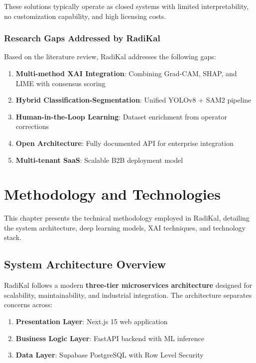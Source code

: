 \documentclass[12pt,a4paper]{report}
\begin{document}
These solutions typically operate as closed systems with limited interpretability, no customization capability, and high licensing costs.

\subsection{Research Gaps Addressed by RadiKal}

Based on the literature review, RadiKal addresses the following gaps:

\begin{enumerate}
    \item \textbf{Multi-method XAI Integration}: Combining Grad-CAM, SHAP, and LIME with consensus scoring
    \item \textbf{Hybrid Classification-Segmentation}: Unified YOLOv8 + SAM2 pipeline
    \item \textbf{Human-in-the-Loop Learning}: Dataset enrichment from operator corrections
    \item \textbf{Open Architecture}: Fully documented API for enterprise integration
    \item \textbf{Multi-tenant SaaS}: Scalable B2B deployment model
\end{enumerate}

\chapter{Methodology and Technologies}

This chapter presents the technical methodology employed in RadiKal, detailing the system architecture, deep learning models, XAI techniques, and technology stack.

\section{System Architecture Overview}

RadiKal follows a modern \textbf{three-tier microservices architecture} designed for scalability, maintainability, and industrial integration. The architecture separates concerns across:

\begin{enumerate}
    \item \textbf{Presentation Layer}: Next.js 15 web application
    \item \textbf{Business Logic Layer}: FastAPI backend with ML inference
    \item \textbf{Data Layer}: Supabase PostgreSQL with Row Level Security
\end{enumerate}
\end{document}
